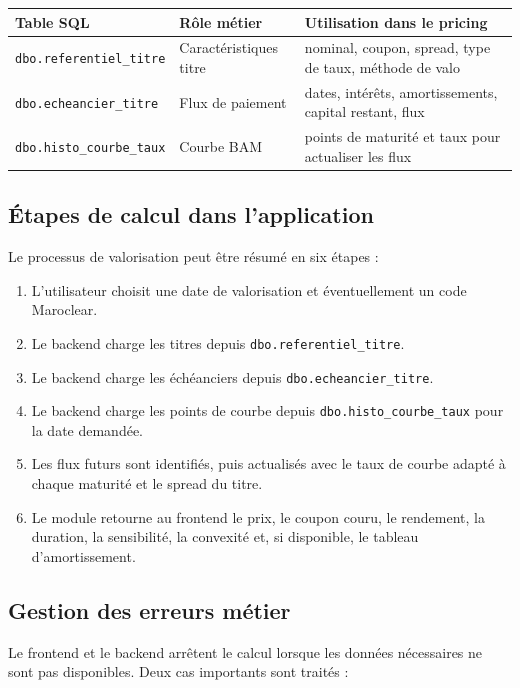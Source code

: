 \documentclass[12pt,a4paper]{article}
\begin{document}
\begin{center}
\begin{tabular}{lll}
\toprule
Table SQL & Rôle métier & Utilisation dans le pricing \\
\midrule
\texttt{dbo.referentiel\_titre} & Caractéristiques titre & nominal, coupon, spread, type de taux, méthode de valo \\
\texttt{dbo.echeancier\_titre} & Flux de paiement & dates, intérêts, amortissements, capital restant, flux \\
\texttt{dbo.histo\_courbe\_taux} & Courbe BAM & points de maturité et taux pour actualiser les flux \\
\bottomrule
\end{tabular}
\end{center}

\subsection{Étapes de calcul dans l'application}

Le processus de valorisation peut être résumé en six étapes :

\begin{enumerate}
    \item L'utilisateur choisit une date de valorisation et éventuellement un code Maroclear.
    \item Le backend charge les titres depuis \texttt{dbo.referentiel\_titre}.
    \item Le backend charge les échéanciers depuis \texttt{dbo.echeancier\_titre}.
    \item Le backend charge les points de courbe depuis \texttt{dbo.histo\_courbe\_taux} pour la date demandée.
    \item Les flux futurs sont identifiés, puis actualisés avec le taux de courbe adapté à chaque maturité et le spread du titre.
    \item Le module retourne au frontend le prix, le coupon couru, le rendement, la duration, la sensibilité, la convexité et, si disponible, le tableau d'amortissement.
\end{enumerate}

\subsection{Gestion des erreurs métier}

Le frontend et le backend arrêtent le calcul lorsque les données nécessaires ne sont pas disponibles. Deux cas importants sont traités :
\end{document}
